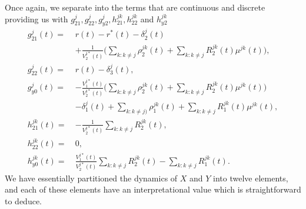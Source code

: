 \documentclass[12pt]{article}
\theoremstyle{my_thm}
\theoremstyle{my_rem}
\begin{document}
Once again, we separate into the terms that are continuous and discrete providing us with
$g_{21}^j,g_{22}^j,g_{y2}^j,h_{21}^{jk},h_{22}^{jk}$ and $h_{y2}^{jk}$
\begin{align*}
g^j_{21}(t)= \ &
r(t)-r^*(t)-\delta_2^{j}(t)
\\
& + \frac{1}{V_2^{j*}(t)} \bigg( 
\sum_{k:k\neq j} \rho_2^{jk}(t)
+\sum_{k:k \neq j}  R^{jk}_2(t) \mu^{jk}(t) 
\bigg),
\\
g^j_{22}(t)= \ & r(t) -\delta_3^{j}(t),
\\
g^j_{y0}(t)= \ & - \frac{V_1^{j*}(t)}{V_2^{j*}(t)}\bigg(
\sum_{k:k\neq j} \rho^{jk}_2(t) 
 +\sum_{k:k\neq j} R^{jk}_2(t) \mu^{jk}(t) 
\bigg)
\\
&-\delta_1^{j}(t)
+
\sum_{k:k\neq j)} \rho^{jk}_1(t) 
+\sum_{k:k \neq j}  R_1^{jk}(t) \mu^{jk}(t) ,
\\
h^{jk}_{21}(t)= \ & 
- \frac{1}{V_2^{j*}(t)} \sum_{k:k \neq j}  R^{jk}_2(t),
\\
h^{jk}_{22}(t)= \ & 0,
\\
h^{jk}_{y0}(t)= \ & \frac{V_1^{j*}(t)}{V_2^{j*}(t)}
\sum_{k:k\neq j} R^{jk}_2(t) 
-
\sum_{k:k \neq j}  R_1^{jk}(t).
\end{align*}
We have essentially partitioned the dynamics of $X$ and $Y$ into twelve elements, and each of these elements have an interpretational value which is straightforward to deduce.



\newpage


\end{document}
